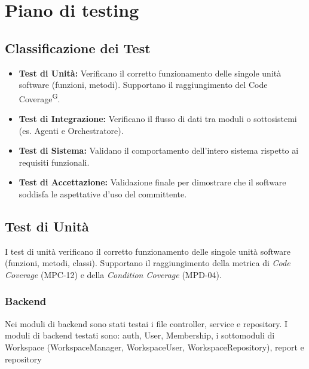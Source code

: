\documentclass[a4paper, 11pt]{article}
\renewcommand{\arraystretch}{1.4} %
\begin{document}
\newpage

\section{Piano di testing}

\subsection{Classificazione dei Test}
\begin{itemize}
    \item \textbf{Test di Unità:} Verificano il corretto funzionamento delle singole unità software (funzioni, metodi). Supportano il raggiungimento del Code Coverage\textsuperscript{G}.
    \item \textbf{Test di Integrazione:} Verificano il flusso di dati tra moduli o sottosistemi (es. Agenti e Orchestratore).
    \item \textbf{Test di Sistema:} Validano il comportamento dell'intero sistema rispetto ai requisiti funzionali.
    \item \textbf{Test di Accettazione:} Validazione finale per dimostrare che il software soddisfa le aspettative d'uso del committente.
\end{itemize}

\subsection{Test di Unità}
I test di unità verificano il corretto funzionamento delle singole unità
software (funzioni, metodi, classi). Supportano il raggiungimento della
metrica di \emph{Code Coverage} (MPC-12) e della \emph{Condition Coverage}
(MPD-04).

\subsubsection{Backend}
Nei moduli di backend sono stati testai i file controller, service e repository.
I moduli di backend testati sono: auth, User, Membership, i sottomoduli di Workspace (WorkspaceManager, WorkspaceUser, WorkspaceRepository), report e repository
\renewcommand{\arraystretch}{1.5}
\setlength{\LTleft}{0pt plus 1fill}
\setlength{\LTright}{0pt plus 1fill}
\newcommand{\Soddisfatto}{Soddisfatto}
\newcommand{\Mancante}{\textcolor{red}{\textbf{Mancante}}}
\newcommand{\sectionrow}[1]{
\rowcolor{gray}
\multicolumn{4}{l}{\textcolor{white}{#1}} \\
\rowcolors{2}{LightGray}{white}
\global\rownum=0
}
\end{document}
